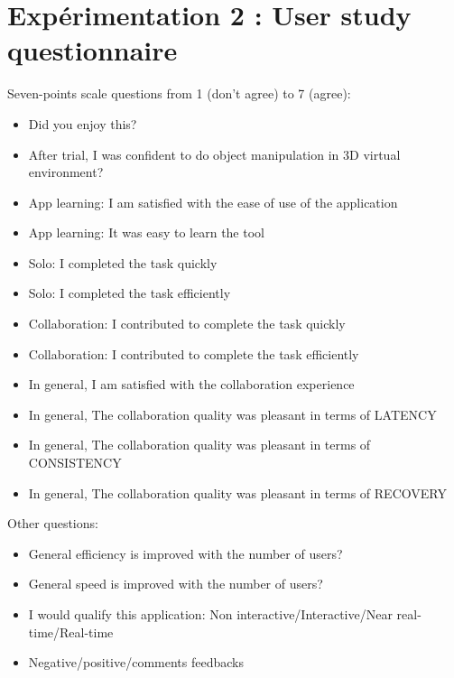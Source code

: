 \section{Expérimentation 2 : User study questionnaire}
\label{app:quest}
Seven-points scale questions from 1 (don't agree) to 7 (agree):
\begin{itemize}
	\item Did you enjoy this?
	\item After trial, I was confident to do object manipulation in 3D virtual 
	environment?
	\item App learning: I am satisfied with the ease of use of the application
	\item App learning: It was easy to learn the tool
	\item Solo: I completed the task quickly
	\item Solo: I completed the task efficiently
	\item Collaboration: I contributed to complete the task quickly
	\item Collaboration: I contributed to complete the task efficiently
	\item In general, I am satisfied with the collaboration experience
	\item In general, The collaboration quality was pleasant in terms of LATENCY
	\item In general, The collaboration quality was pleasant in terms of 
	CONSISTENCY
	\item In general, The collaboration quality was pleasant in terms of RECOVERY
\end{itemize}
Other questions:
\begin{itemize}
	\item General efficiency is improved with the number of users?
	\item General speed is improved with the number of users?
	\item I would qualify this application: Non interactive/Interactive/Near 
	real-time/Real-time
	\item Negative/positive/comments feedbacks
\end{itemize}


